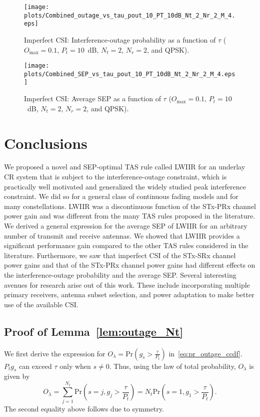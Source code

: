 \documentclass[12pt,draftcls,peerreview,onecolumn]{IEEEtran}
\newcommand{\brac}[1]{\left({#1}\right)}
\newcommand{\prob}[1]{\text{Pr}\brac{#1}}
\newcommand{\lam}{\lambda}
\newcommand{\Nt}{{N_t}}
\newcommand{\Nr}{{N_r}}
\newcommand{\Pt}{{P_t}}
\newcommand{\puch}{g}
\newcommand{\gk}[1]{{\puch_{#1}}}
\newcommand{\outmax}{O_{\text{max}}}
\newcommand{\itau}{\tau}
\newcommand{\out}{O}
\newcommand{\taubypt}{\frac{\itau}{\Pt}}
\newcommand{\gkgrtaubypt}[1]{{\gk{#1}}>\taubypt}
\newcommand{\outlam}{\out_{\lam}}
\newcommand{\eqidx}{j}
\begin{document}
\begin{figure}
	\centering
	 \texttt{[image: plots/Combined\_outage\_vs\_tau\_pout\_10\_PT\_10dB\_Nt\_2\_Nr\_2\_M\_4.eps]}
	\caption{Imperfect CSI: Interference-outage probability as a function of $\itau$ ($\outmax=0.1$, $\Pt = 10$~dB, $\Nt = 2$, $\Nr = 2$, and QPSK).}
	\label{fig:out_vs_tau_imp_CSI}
\end{figure}


\begin{figure}
	\centering \texttt{[image: plots/Combined\_SEP\_vs\_tau\_pout\_10\_PT\_10dB\_Nt\_2\_Nr\_2\_M\_4.eps]}
	\caption{Imperfect CSI: Average SEP as a function of $\itau$ ($\outmax=0.1$, $\Pt = 10$~dB, $\Nt = 2$, $\Nr = 2$, and QPSK).}
	\label{fig:sep_vs_tau_imp_CSI}
\end{figure}




\section{Conclusions}
\label{sec:conclusions}
We proposed a novel and SEP-optimal TAS rule called LWIIR for an underlay CR system that is subject to the interference-outage constraint, which is practically well motivated and generalized the widely studied peak interference constraint. We did so for a general class of continuous fading models and for many constellations. LWIIR was a discontinuous function of the STx-PRx channel power gain and was different from the many TAS rules proposed in the literature. We derived a general expression for the average SEP of LWIIR for an arbitrary number of transmit and receive antennas. We showed that LWIIR provides a significant performance gain compared to the other TAS rules considered in the literature. Furthermore, we saw that imperfect CSI of the STx-SRx channel power gains and that of the STx-PRx channel power gains had different effects on the interference-outage probability and the average SEP. Several interesting avenues for research arise out of this work. These include incorporating multiple primary receivers, antenna subset selection, and power adaptation to make better use of the available CSI.

\appendix
\subsection{Proof of Lemma~\ref{lem:outage_Nt}}
\label{proof:outage_Nt}
We first derive the expression for $\outlam = \prob{\gkgrtaubypt{s}}$ in~\eqref{eq:pr_outage_ccdf}. $\Pt \gk{s}$ can exceed  $\itau$ only when $s\neq0$. Thus, using the law of total probability, $\outlam$ is given by
%
\begin{equation}
\outlam =  \sum_{\eqidx=1}^{\Nt}\text{Pr}\brac{s=\eqidx,\gk{\eqidx}>\taubypt}=\Nt\text{Pr}\brac{s=1,\gk{1}>\taubypt}.
\label{eq:out_1}
\end{equation}
%
The second equality above follows due to symmetry.
\end{document}
